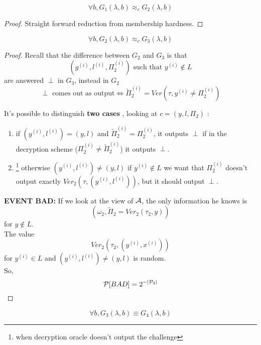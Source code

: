 \begin{lemma}
    \[
        \forall b, G_{1}(\lambda, b) \approx_{c} G_{2}(\lambda, b)   
    \]
\end{lemma}
\begin{proof}
    Straight forward reduction from membership hardness.
\end{proof}

\begin{lemma}
    \[
        \forall b, G_{2}(\lambda , b) \approx_{c} G_{3}(\lambda, b)
    \]
\end{lemma}
\begin{proof}
    Recall that the difference between $G_{2}$ and $G_{3}$ is that 
    \[
        (g^{(i)}, l^{(i)}, \Pi_{2}^{(i)})\text{ such that }y^{(i)}\not\in L 
    \]
    are answered $\perp$ in $G_{3}$, instead in $G_{2}$
    \[
        \perp \text{ comes out as output} \Leftrightarrow
        \tilde{\Pi}^{(i)}_{2}=Ver(\tau, y^{(i)}\not=\Pi^{(i)}_{2})
    \]

    It's possible to distinguish \textbf{two cases} , looking at $c=(y, l,
    \Pi_{2})$ :
\begin{enumerate}
    \item if $(y^{(i)}, l^{(i)})=(y,l)$ and
        $\tilde{\Pi}^{(i)}_{2}=\Pi^{(i)}_{2}$, it outputs $\perp$ if  in the
        decryption scheme ($\Pi^{(i)}_{2} \not= \tilde{\Pi}^{(i)}_{2}$) it
        outputs $\perp$.\\

    \item \footnote{when decryption oracle doesn't output the challenge}
        otherwise $(y^{(i)}, l^{(i)})\not= (y,l)$ if $y^{(i)}\not\in L$ we want
        that $\Pi^{(i)}_{2}$ doesn't output exactly $Ver_{2}(\tau, (y^{(i)},
        l^{(i)}))$, but it should output $\perp$.
\end{enumerate}

\textbf{EVENT BAD:} If we look at the view of $\A$, the only information he
knows is 
\[
    (\omega_{2}, \tilde{\Pi}_{2}=Ver_{2}(\tau_{2}, y))
\]
for $y \not\in L$.\\
The value 
\[
Ver_{2}(\tau_{2}, (y^{(i)}, x^{(i)}))
\]
for $y^{(i)} \in L$ and
$(y^{(i)}, l^{(i)})\not=(y, l)$ is random.\\
So, 
\[
\P [ BAD ] =2^{-|\P_{2}|} 
\]

\end{proof}

\begin{lemma}
    \[
        \forall b , G_{3}(\lambda, b)\equiv G_{4}(\lambda, b)   
    \]
\end{lemma}

